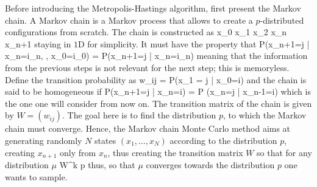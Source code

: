 		Before introducing the Metropolis-Hastings algorithm, first present the Markov chain. A Markov chain is a Markov process that allows to create a $p$-distributed configurations from scratch. The chain is constructed as
		\be x_0 \rightarrow x_1 \rightarrow x_2 \rightarrow \cdots \rightarrow x_n \rightarrow x_{n+1} \rightarrow \cdots \ee
		staying in $1$D for simplicity. It must have the property that
		\be \mc P(x_{n+1}=j | x_n=i_n, \dotsc, x_0=i_0) = \mc P(x_{n+1}=j | x_n=i_n) \ee
		meaning that the information from the previous steps is not relevant for the next step; this is memoryless. Define the transition probability as 
		\be w_{ij} = \mc P(x_1 = j  | x_0=i) \ee
		and the chain is said to be homogeneous if
		\be \mc P(x_{n+1}=j | x_n=i) = \mc P (x_n=j | x_{n-1}=i) \ee
		which is the one one will consider from now on. The transition matrix of the chain is given by $W=(w_{ij})$. The goal here is to find the distribution $p$, to which the Markov chain must converge. Hence, the Markov chain Monte Carlo method aims at generating randomly $N$ states $(x_1,\dotsc, x_N)$ according to the distribution $p$, creating $x_{n+1}$ only from $x_n$, thus creating the transition matrix $W$ so that for any distribution $\mu$
		\be W^k \mu {} p \ee
		thus, so that $\mu$ converges towards the distribution $p$ one wants to sample.

